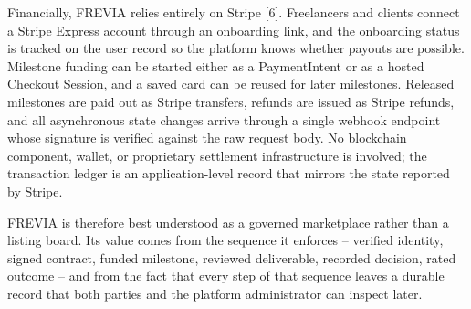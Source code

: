 Financially, FREVIA relies entirely on Stripe [6]. Freelancers and clients connect a Stripe Express account through an onboarding link, and the onboarding status is tracked on the user record so the platform knows whether payouts are possible. Milestone funding can be started either as a PaymentIntent or as a hosted Checkout Session, and a saved card can be reused for later milestones. Released milestones are paid out as Stripe transfers, refunds are issued as Stripe refunds, and all asynchronous state changes arrive through a single webhook endpoint whose signature is verified against the raw request body. No blockchain component, wallet, or proprietary settlement infrastructure is involved; the transaction ledger is an application-level record that mirrors the state reported by Stripe.

FREVIA is therefore best understood as a governed marketplace rather than a listing board. Its value comes from the sequence it enforces -- verified identity, signed contract, funded milestone, reviewed deliverable, recorded decision, rated outcome -- and from the fact that every step of that sequence leaves a durable record that both parties and the platform administrator can inspect later.
